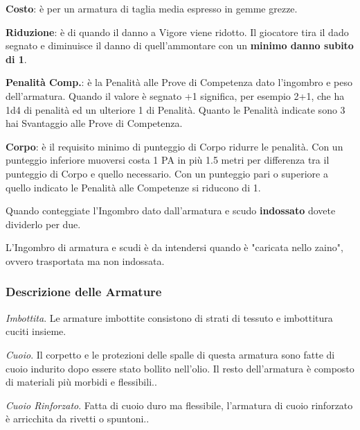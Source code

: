 \documentclass[12pt,a4paper,twoside,openany]{book}
\begin{document}
\begin{multicols}{2}

\textbf{Costo}: è per un armatura di taglia media espresso in gemme grezze.

\textbf{Riduzione}: è di quando il danno a Vigore viene ridotto. Il giocatore tira il dado segnato e diminuisce il danno di quell'ammontare con un \textbf{minimo danno subito di 1}.

\textbf{Penalità Comp.}: è la Penalità alle Prove di Competenza dato l'ingombro e peso dell'armatura. Quando il valore è segnato +1 significa, per esempio 2+1, che ha 1d4 di penalità ed un ulteriore 1 di Penalità. Quanto le Penalità indicate sono 3 hai Svantaggio alle Prove di Competenza.

\textbf{Corpo}: è il requisito minimo di punteggio di Corpo ridurre le penalità. Con un punteggio inferiore muoversi costa 1 PA in più 1.5 metri per differenza tra il punteggio di Corpo e quello necessario. Con un punteggio pari o superiore a quello indicato le Penalità alle Competenze si riducono di 1.

\medskip

\begin{changemargin}{0.3cm}{0.3cm}\begin{narratore} Quando conteggiate l'Ingombro dato dall'armatura e scudo \textbf{indossato} dovete dividerlo per due.

L'Ingombro di armatura e scudi è da intendersi quando è "caricata nello zaino", ovvero trasportata ma non indossata.\end{narratore}\end{changemargin}

\subsubsection{Descrizione delle Armature}


\textit{Imbottita}. Le armature imbottite consistono di strati di tessuto e imbottitura cuciti insieme.

\textit{Cuoio}. Il corpetto e le protezioni delle spalle di questa armatura sono fatte di cuoio indurito dopo essere stato bollito nell'olio. Il resto dell'armatura è composto di
materiali più morbidi e flessibili..

\textit{Cuoio Rinforzato}. Fatta di cuoio duro ma flessibile, l'armatura di cuoio rinforzato è arricchita da rivetti o spuntoni..


\end{multicols}
\end{document}
